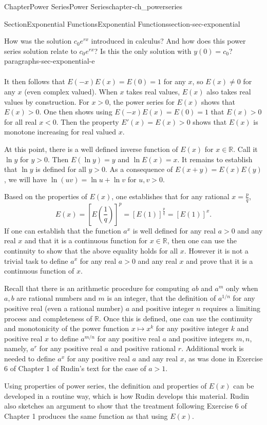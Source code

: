 \documentclass[oneside,10pt,]{book}
\numberwithin{equation}{section}
\newcommand{\bbR}{\mathbb{R}}
\newcommand{\lt}{<}
\newcommand{\gt}{>}
\begin{document}
\begin{chapterptx}{Chapter}{Power Series}{}{Power Series}{}{}{chapter-ch_powerseries}
\begin{sectionptx}{Section}{Exponential Functions}{}{Exponential Functions}{}{}{section-sec-exponential}
\begin{paragraphs}{How was the solution \(c_{0}e^{rx}\) introduced in calculus? And how does this power series solution relate to \(c_{0}e^{rx}\)? Is this the only solution with \(y(0)=c_{0}\)?}{paragraphs-sec-exponential-e}
\begin{align*}
\end{align*}
%
\par
It then follows that \(E(-x)E(x)=E(0)=1\) for any \(x\), so \(E(x)\ne 0\) for any \(x\) (even complex valued). When \(x\) takes real values, \(E(x)\)  also takes real values by construction. For \(x\gt 0\), the power series for \(E(x)\) shows that \(E(x)\gt 0\). One then shows using  \(E(-x)E(x)=E(0)=1\) that \(E(x)>0\) for all real \(x \lt 0\). Then the property \(E'(x)=E(x)>0\) shows that \(E(x)\) is monotone increasing for real valued \(x\).%
\par
At this point, there is a well defined inverse function of \(E(x)\) for \(x\in \mathbb R\). Call it \(\ln y\) for \(y > 0\). Then \(E(\ln y)=y\) and \(\ln E(x) =x\). It remains to establish that \(\ln y\) is defined for all \(y>0\). As a consequence of \(E(x+y) =E(x) E(y)\), we will have \(\ln (u v)=\ln u + \ln v\) for \(u, v>0\).%
\par
Based on the properties of \(E(x)\), one establishes that for any rational \(x=\frac pq\),%
\begin{equation*}
E(x)=[E(\frac 1q)]^{p}=[E(1)]^{\frac pq}=[E(1)]^{x}.
\end{equation*}
If one can establish that the function \(a^{x}\) is well defined for any real \(a > 0\) and any real \(x\) and that it is a continuous function for \(x\in \bbR\), then one can use the continuity to show that the above equality holds for all \(x\). However it is not a trivial task to define \(a^{x}\) for any real \(a > 0\) and any real \(x\) and prove that it is a continuous function of \(x\).%
\par
Recall that there is an arithmetic procedure for computing \(a b\) and \(a^{m}\) only when \(a, b\) are rational numbers and \(m\) is an integer, that the definition of \(a^{1/n}\) for any positive real (even a rational number) \(a\) and positive integer \(n\) requires a limiting process and completeness of \(\bbR\). Once this is defined,  one can use the continuity and monotonicity of the power function \(x\mapsto x^{k}\) for any positive integer \(k\) and positive real \(x\) to define \(a^{m/n}\) for any positive real \(a\) and positive integers \(m, n\), namely, \(a^{r}\) for any positive real \(a\) and positive rational \(r\).  Additional work is needed to define \(a^{x}\) for any positive real \(a\) and any real \(x\), as was done in Exercise 6 of Chapter 1 of Rudin's text for the case of \(a > 1\).%
\par
Using properties of power series, the definition and properties of \(E(x)\) can be developed in a routine way, which is how Rudin develops this material. Rudin also sketches an argument to show that the treatment following Exercise 6 of Chapter 1 produces the same function as that using \(E(x)\).%

\end{paragraphs}
\end{sectionptx}
\end{chapterptx}
\end{document}
